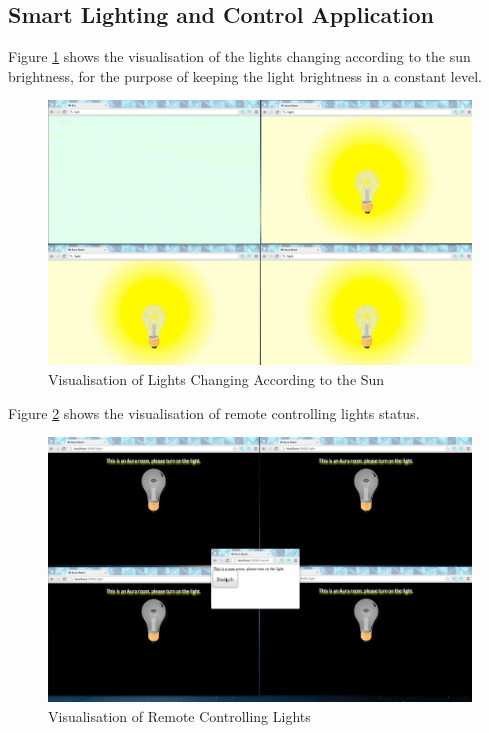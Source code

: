 \subsection{Smart Lighting and Control Application}

Figure \ref{fig:screen-shot-home-auto} shows the visualisation of the lights changing according to the sun brightness, for the purpose of keeping the light brightness in a constant level.

\begin{figure}[ht]
  \begin{center}
    \includegraphics[width=1\textwidth]{images/screen-shot-home-auto.pdf}
    \caption{Visualisation of Lights Changing According to the Sun}
    \label{fig:screen-shot-home-auto}
  \end{center}
\end{figure}

Figure \ref{fig:screen-shot-home-auto-2} shows the visualisation of remote controlling lights status.

\begin{figure}[ht]
  \begin{center}
    \includegraphics[width=1\textwidth]{images/screen-shot-home-auto-2.pdf}
    \caption{Visualisation of Remote Controlling Lights}
    \label{fig:screen-shot-home-auto-2}
  \end{center}
\end{figure}


